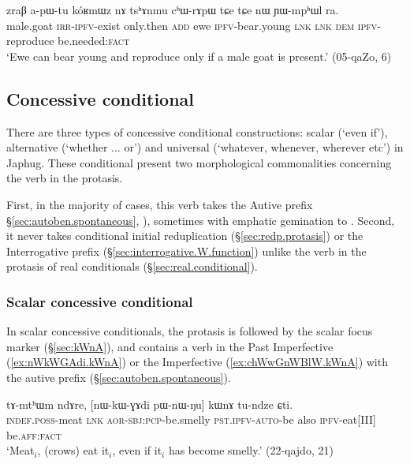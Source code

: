 \begin{exe}
	\ex \label{ex:nWkoRmWznA.only.if2}
	\gll zraβ a-pɯ-tu kóʁmɯz nɤ tsʰɤnmu cʰɯ-rɤpɯ tɕe tɕe nɯ ɲɯ-mpʰɯl ra.\\
	male.goat \textsc{irr}-\textsc{ipfv}-exist only.then \textsc{add} ewe \textsc{ipfv}-bear.young \textsc{lnk} \textsc{lnk} \textsc{dem} \textsc{ipfv}-reproduce be.needed:\textsc{fact} \\
	\glt `Ewe can bear young and reproduce only if a male goat is present.' (05-qaZo, 6)
\end{exe}
 
 \subsection{Concessive conditional} \label{sec:concessive.conditional}
There are three types of concessive conditional constructions: scalar (`even if'), alternative (`whether ... or') and universal (`whatever, whenever, wherever etc') in Japhug. These conditional present two morphological commonalities concerning the verb in the protasis. 

First, in the majority of cases, this verb  takes the Autive prefix   §\ref{sec:autoben.spontaneous}, \citealt[298--300]{jacques14linking}), sometimes with emphatic gemination to . Second, it never takes  conditional initial reduplication (§\ref{sec:redp.protasis}) or the Interrogative prefix (§\ref{sec:interrogative.W.function}) unlike the verb in the protasis of real conditionals (§\ref{sec:real.conditional}).  

 
\subsubsection{Scalar concessive conditional} \label{sec:scalar.concessive.conditional}
In scalar concessive conditionals, the protasis is followed by the scalar focus marker  (§\ref{sec:kWnA}), and contains a verb  in the Past Imperfective (\ref{ex:nWkWGAdi.kWnA}) or the Imperfective (\ref{ex:chWwGnWBlW.kWnA}) with the autive prefix (§\ref{sec:autoben.spontaneous}).
 
\begin{exe}
\ex \label{ex:nWkWGAdi.kWnA}
 \gll tɤ-mtʰɯm ndɤre, [nɯ-kɯ-ɣɤdi pɯ-nɯ-ŋu] kɯnɤ tu-ndze ɕti. \\
 \textsc{indef}.\textsc{poss}-meat \textsc{lnk} \textsc{aor}-\textsc{sbj}:\textsc{pcp}-be.smelly \textsc{pst}.\textsc{ipfv}-\textsc{auto}-be also \textsc{ipfv}-eat[III] be.\textsc{aff}:\textsc{fact} \\
\glt `Meat$_i$, (crows) eat it$_i$, even if it$_i$ has become smelly.' (22-qajdo, 21)
 \end{exe}
 
